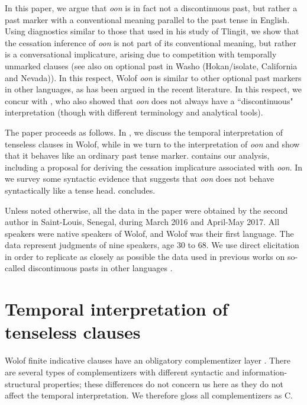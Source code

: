 \documentclass[output=paper,newtxmath,modfonts,nonflat,draftmode]{langsci/langscibook}
\begin{document}
In this paper, we argue that \textit{oon} is in fact not a discontinuous past, but rather a past marker with a conventional meaning parallel to the past tense in English. Using diagnostics similar to those that \citet{Cable2017a} used in his study of Tlingit, we show that the cessation inference of \textit{oon} is not part of its conventional meaning, but rather is a conversational implicature, arising due to competition with temporally unmarked clauses (see also \citealt{bochnak16past} on optional past in Washo (Hokan/isolate, California and Nevada)). In this respect, Wolof \textit{oon} is similar to other optional past markers in other languages, as has been argued in the recent literature. In this respect, we concur with \citet{church81systeme}, who also showed that \textit{oon} does not always have a ``discontinuous" interpretation (though with different terminology and analytical tools). %
 
The paper proceeds as follows. In , we discuss the temporal
interpretation of tenseless clauses in Wolof, while in  we
turn to the interpretation of \textit{oon} and show that it behaves
like an ordinary past tense marker.  contains our analysis, including a proposal for
deriving the cessation implicature associated with \textit{oon}. In
 we survey some syntactic evidence that suggests that
\textit{oon} does not behave syntactically like a tense head.  concludes.

Unless noted otherwise, all the data in the paper were obtained by the
second author in Saint-Louis, Senegal, during March 2016 and
April-May 2017. All speakers were native speakers of Wolof, and Wolof
was their first language. The data represent judgments of nine speakers,
age 30 to 68.  We use direct elicitation in order to replicate as closely as possible the data used in previous works on so-called discontinuous pasts in other languages \citep{bochnak16past, Cable2017a}.


\section{Temporal interpretation of tenseless clauses}\label{sec:bochnak:2}

Wolof finite indicative clauses have an obligatory complementizer
layer \citep{Martinovic2015b}. There are several types of
complementizers with different syntactic and information-structural
properties; these differences do not concern us here as they do not
affect the temporal interpretation. We therefore gloss all
complementizers as C.
\end{document}
